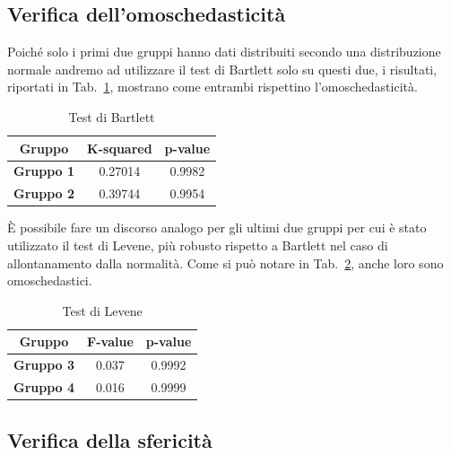 \documentclass[conference]{IEEEtran}
\begin{document}
\subsection{Verifica dell'omoschedasticità}

Poiché solo i primi due gruppi hanno dati distribuiti secondo una distribuzione normale
andremo ad utilizzare il test di Bartlett solo su questi due, i risultati,
riportati in Tab.~\ref{tab2}, mostrano come entrambi rispettino l'omoschedasticità.
\begin{table}[htbp]
    \caption{Test di Bartlett}
    \begin{center}
    \begin{tabular}{|c|c|c|}
    \hline
    \textbf{Gruppo} & \textbf{K-squared} & \textbf{p-value} \\
    \hline
    \textbf{Gruppo 1} & 0.27014 & 0.9982 \\\cline{1-3}
    \textbf{Gruppo 2} & 0.39744 & 0.9954 \\\cline{1-3}
    \hline
    \end{tabular}
    \label{tab2}
    \end{center}
\end{table}

\`E possibile fare un discorso analogo per gli ultimi due gruppi per cui è stato utilizzato il test di
Levene, più robusto rispetto a Bartlett nel caso di allontanamento dalla normalità.
Come si può notare in Tab.~\ref{tab3}, anche loro sono omoschedastici.
\begin{table}[htbp]
    \caption{Test di Levene}
    \begin{center}
    \begin{tabular}{|c|c|c|}
    \hline
    \textbf{Gruppo} & \textbf{F-value} & \textbf{p-value} \\
    \hline
    \textbf{Gruppo 3} & 0.037 & 0.9992 \\\cline{1-3}
    \textbf{Gruppo 4} & 0.016 & 0.9999 \\\cline{1-3}
    \hline
    \end{tabular}
    \label{tab3}
    \end{center}
\end{table}

\subsection{Verifica della sfericità}
\end{document}
